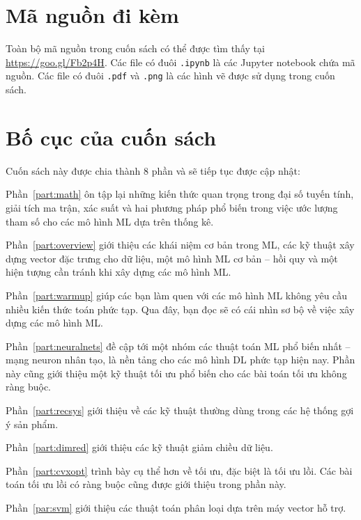 \section{Mã nguồn đi kèm}
Toàn bộ mã nguồn trong cuốn sách có thể được tìm thấy tại
\url{https://goo.gl/Fb2p4H}. Các file có đuôi \texttt{.ipynb} là các
Jupyter notebook chứa mã nguồn. Các file có đuôi \texttt{.pdf} và \texttt{.png}
là các hình vẽ được sử dụng trong cuốn sách.

\section{Bố cục của cuốn sách}
Cuốn sách này được chia thành 8 phần và sẽ tiếp tục được cập nhật:

{Phần~\ref{part:math}} ôn tập lại những kiến thức quan trọng trong đại số tuyến
tính, giải tích ma trận, xác suất và hai phương pháp phổ biến trong việc ước
lượng tham số cho các mô hình ML dựa trên thống kê.

Phần~\ref{part:overview} giới thiệu các khái niệm cơ bản trong ML, các kỹ thuật
xây dựng vector đặc trưng cho dữ liệu, một mô hình ML cơ bản -- hồi quy và một hiện tượng cần tránh khi xây dựng các mô hình ML.

Phần~\ref{part:warmup} giúp các bạn làm quen với các mô hình ML không yêu cầu
nhiều kiến thức toán phức tạp. Qua đây, bạn đọc sẽ có cái nhìn sơ bộ về việc xây
dựng các mô hình ML.


Phần~\ref{part:neuralnets} đề cập tới một nhóm các thuật toán ML phổ biến nhất
-- mạng neuron nhân tạo, là nền tảng cho các mô hình DL phức tạp
hiện nay. Phần này cũng giới thiệu một kỹ thuật tối ưu phổ biến cho các bài toán
tối ưu không ràng buộc.

Phần~\ref{part:recsys} giới thiệu về các kỹ thuật thường dùng trong các hệ thống
gợi ý sản phẩm.

Phần~\ref{part:dimred} giới thiệu các kỹ thuật giảm chiều dữ liệu.

Phần~\ref{part:cvxopt} trình bày cụ thể hơn về tối ưu, đặc biệt là tối ưu lồi.
Các bài toán tối ưu lồi có ràng buộc cũng được giới thiệu trong phần này.

Phần~\ref{par:svm} giới thiệu các thuật toán phân loại dựa trên máy vector hỗ trợ.


